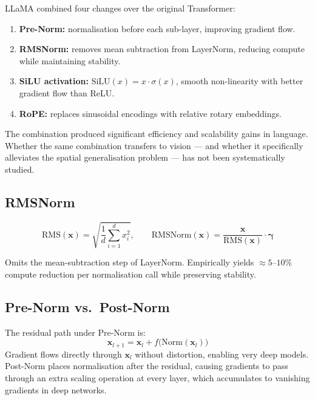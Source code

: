 \documentclass[12pt,a4paper]{article}
\begin{document}
LLaMA \cite{llama2023} combined four changes over the original Transformer:
\begin{enumerate}[leftmargin=1.8em]
  \item \textbf{Pre-Norm:} normalisation before each sub-layer, improving
        gradient flow.
  \item \textbf{RMSNorm:} removes mean subtraction from LayerNorm, reducing
        compute while maintaining stability.
  \item \textbf{SiLU activation:} $\mathrm{SiLU}(x) = x \cdot \sigma(x)$,
        smooth non-linearity with better gradient flow than ReLU.
  \item \textbf{RoPE:} replaces sinusoidal encodings with relative rotary
        embeddings.
\end{enumerate}

The combination produced significant efficiency and scalability gains in
language. Whether the same combination transfers to vision --- and whether it
specifically alleviates the spatial generalisation problem --- has not been
systematically studied.

\subsection{RMSNorm}

\begin{equation}
  \mathrm{RMS}(\mathbf{x}) = \sqrt{\frac{1}{d}\sum_{i=1}^{d} x_i^2},
  \qquad
  \mathrm{RMSNorm}(\mathbf{x})
    = \frac{\mathbf{x}}{\mathrm{RMS}(\mathbf{x})} \cdot \boldsymbol{\gamma}
\end{equation}

Omits the mean-subtraction step of LayerNorm. Empirically yields $\approx
5$--$10\%$ compute reduction per normalisation call while preserving stability.

\subsection{Pre-Norm vs.\ Post-Norm}

The residual path under Pre-Norm is:
\begin{equation}
  \mathbf{x}_{l+1}
    = \mathbf{x}_l + f\!\bigl(\mathrm{Norm}(\mathbf{x}_l)\bigr)
\end{equation}
Gradient flows directly through $\mathbf{x}_l$ without distortion, enabling
very deep models. Post-Norm places normalisation after the residual, causing
gradients to pass through an extra scaling operation at every layer, which
accumulates to vanishing gradients in deep networks.
\end{document}
